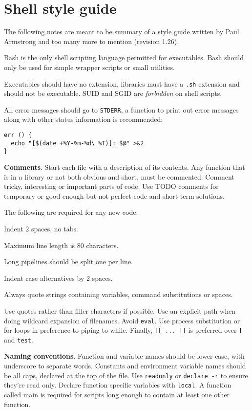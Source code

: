 \section{Shell style guide}
The following notes are meant to be summary of a style guide written by Paul Armstrong and too many more to mention (revision 1.26).

Bash is the only shell scripting language permitted for executables.
Bash should only be used for simple wrapper scripts or small utilities.

Executables should have no extension, libraries must have a \texttt{.sh} extension and should not be executable.
SUID and SGID are \emph{forbidden} on shell scripts.

All error messages should go to \texttt{STDERR},
a function to print out error messages along with other status information is recommended:
\begin{verbatim}
err () {
  echo "[$(date +%Y-%m-%d\ %T)]: $@" >&2
}
\end{verbatim}

\textbf{Comments}.
Start each file with a description of its contents.
Any function that is in a library or not both obvious and short, must be commented.
Comment tricky, interesting or important parts of code.
Use TODO comments for temporary or good enough but not perfect code and short-term solutions.

The following are required for any new code:
\begin{compactenum}
\item Indent 2 spaces, no tabs.
\item Maximum line length is 80 characters.
\item Long pipelines should be split one per line. %
\item Indent case alternatives by 2 spaces.
\item Always quote strings containing variables, command substitutions or spaces. %
\end{compactenum}

Use quotes rather than filler characters if possible.
Use an explicit path when doing wildcard expansion of filenames.
Avoid \texttt{eval}.
Use process substitution or for loops in preference to piping to while.
Finally, \texttt{[[ ... ]]} is preferred over \texttt{[} and \texttt{test}.

\textbf{Naming conventions}.
Function and variable names should be lower case, with underscore to separate words.
Constants and environment variable names should be all caps, declared at the top of the file.
Use \texttt{readonly} or \texttt{declare -r} to ensure they're read only.
Declare function specific variables with \texttt{local}.
A function called main is required for scripts long enough to contain at least one other function.


